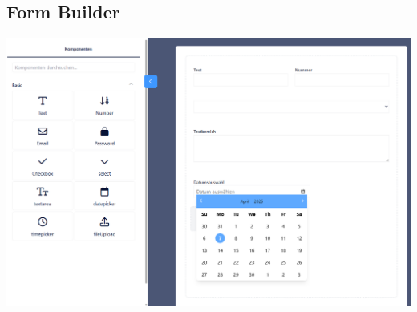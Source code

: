 \documentclass[a4paper,11pt]{article}
\begin{document}
\newpage
\subsection{Form Builder}
\includegraphics[width=1.1\textwidth]{formbuilder}

\newpage
\end{document}
